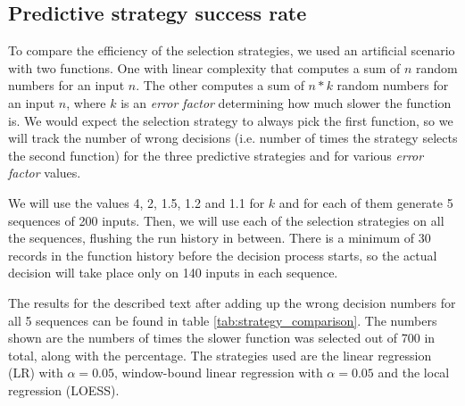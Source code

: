 \subsection{Predictive strategy success rate}

To compare the efficiency of the selection strategies, we used an artificial scenario with two functions. One with linear complexity that computes a sum of $n$ random numbers for an input $n$. The other computes a sum of $n * k$ random numbers for an input $n$, where $k$ is an \textit{error factor} determining how much slower the function is. We would expect the selection strategy to always pick the first function, so we will track the number of wrong decisions (i.e. number of times the strategy selects the second function) for the three predictive strategies and for various \textit{error factor} values.

We will use the values 4, 2, 1.5, 1.2 and 1.1 for $k$ and for each of them generate 5 sequences of 200 inputs. Then, we will use each of the selection strategies on all the sequences, flushing the run history in between. There is a minimum of 30 records in the function history before the decision process starts, so the actual decision will take place only on 140 inputs in each sequence.

The results for the described text after adding up the wrong decision numbers for all 5 sequences can be found in table \ref{tab:strategy_comparison}. The numbers shown are the numbers of times the slower function was selected out of 700 in total, along with the percentage. The strategies used are the linear regression (LR) with $\alpha = 0.05$, window-bound linear regression with $\alpha = 0.05$ and the local regression (LOESS).

